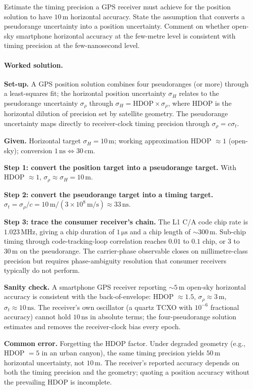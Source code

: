 \begin{exercise}
Estimate the timing precision a GPS receiver must achieve for the
position solution to have $10 \,\si{\meter}$ horizontal accuracy.
State the assumption that converts a pseudorange uncertainty into a
position uncertainty. Comment on whether open-sky smartphone
horizontal accuracy at the few-metre level is consistent with
timing precision at the few-nanosecond level.

\paragraph{Worked solution.}
\textbf{Set-up.} A GPS position solution combines four
pseudoranges (or more) through a least-squares fit; the
horizontal position uncertainty $\sigma_{H}$ relates to the
pseudorange uncertainty $\sigma_{\rho}$ through
$\sigma_{H} = \mathrm{HDOP} \times \sigma_{\rho}$, where HDOP is
the horizontal dilution of precision set by satellite geometry.
The pseudorange uncertainty maps directly to receiver-clock
timing precision through $\sigma_{\rho} = c \sigma_{t}$.

\textbf{Given.} Horizontal target $\sigma_{H} = 10 \,\si{\meter}$;
working approximation HDOP $\approx 1$ (open-sky); conversion
$1 \,\si{\nano\second} \Leftrightarrow 30 \,\si{\centi\meter}$.

\textbf{Step 1: convert the position target into a pseudorange
target.} With HDOP $\approx 1$, $\sigma_{\rho} \approx \sigma_{H}
= 10 \,\si{\meter}$.

\textbf{Step 2: convert the pseudorange target into a timing
target.} $\sigma_{t} = \sigma_{\rho}/c = 10 \,\si{\meter}/
(3 \times 10^{8} \,\si{\meter\per\second}) \approx 33 \,\si{\nano
\second}$.

\textbf{Step 3: trace the consumer receiver's chain.} The L1 C/A
code chip rate is $1.023 \,\si{\mega\hertz}$, giving a chip
duration of $1 \,\si{\micro\second}$ and a chip length of $\sim
300 \,\si{\meter}$. Sub-chip timing through code-tracking-loop
correlation reaches $0.01$ to $0.1$ chip, or $3$ to $30 \,\si
{\meter}$ on the pseudorange. The carrier-phase observable closes
on millimetre-class precision but requires phase-ambiguity
resolution that consumer receivers typically do not perform.

\textbf{Sanity check.} A smartphone GPS receiver reporting
$\sim 5 \,\si{\meter}$ open-sky horizontal accuracy is consistent
with the back-of-envelope: HDOP $\approx 1.5$, $\sigma_{\rho}
\approx 3 \,\si{\meter}$, $\sigma_{t} \approx 10 \,\si{\nano
\second}$. The receiver's own oscillator (a quartz TCXO with
$10^{-6}$ fractional accuracy) cannot hold $10 \,\si{\nano\second}$
in absolute terms; the four-pseudorange solution estimates and
removes the receiver-clock bias every epoch.

\textbf{Common error.} Forgetting the HDOP factor. Under degraded
geometry (e.g., HDOP $= 5$ in an urban canyon), the same timing
precision yields $50 \,\si{\meter}$ horizontal uncertainty, not
$10 \,\si{\meter}$. The receiver's reported accuracy depends on
both the timing precision and the geometry; quoting a position
accuracy without the prevailing HDOP is incomplete.
\end{exercise}


